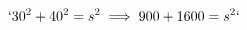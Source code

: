 \documentclass[preview]{standalone}
\begin{document}
\begin{align*}
`30^2 + 40^2 = s^2 \implies 900 + 1600 = s^2`
\end{align*}
\end{document}
